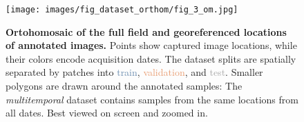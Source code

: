 \begin{figure}
    \centering
    {\texttt{[image: images/fig\_dataset\_orthom/fig\_3\_om.jpg]}}
    \caption{\textbf{Ortohomosaic of the full field and georeferenced locations of annotated images.} Points show captured image locations, while their colors encode acquisition dates. The dataset splits are spatially separated by patches into \textcolor[HTML]{6a8caf}{train}, \textcolor[HTML]{e89c71}{validation}, and \textcolor[HTML]{a8a8a8}{test}. Smaller polygons are drawn around the annotated samples: The \textit{multitemporal} dataset contains samples from the same locations from all dates. Best viewed on screen and zoomed in.}
    \label{fig:dataset_orthom}
\end{figure}
